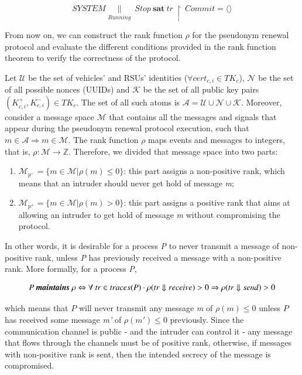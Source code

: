 \documentclass[preprint,12pt]{elsarticle}
\begin{document}
\begin{equation}
\label{eq:systemsatisfystop}
SYSTEM \underset{Running}{\|}~\textit{Stop}~\textbf{sat}~tr~\upharpoonright~\textit{Commit} = \langle \rangle
\end{equation}

From now on, we can construct the rank function $\rho$ for the pseudonym renewal protocol and evaluate the different conditions provided in the rank function theorem to verify the correctness of the protocol.

Let $\mathcal{U}$ be the set of vehicles' and RSUs' identities ($\forall cert_{c, i} \in TK_{c}$), $\mathcal{N}$ be the set of all possible nonces (UUIDs) and $\mathcal{K}$ be the set of all public key pairs $(K^{+}_{c, i}, K^{-}_{c, i}) \in TK_c$. The set of all such atoms is $\mathcal{A} = \mathcal{U} \cup \mathcal{N} \cup \mathcal{K}$. Moreover, consider a message space $\mathcal{M}$ that contains all the messages and signals that appear during the pseudonym renewal protocol execution, such that $m \in \mathcal{A} \Rightarrow m \in \mathcal{M}$. The rank function $\rho$ maps events and messages to integers, that is, $\rho: \mathcal{M} \rightarrow \mathbb{Z}$. Therefore, we divided that message space into two parts:

\begin{enumerate}
	\item $\mathcal{M}_{p^{-}} = \{ m \in \mathcal{M} | \rho(m) \leq 0\}$: this part assigns a non-positive rank, which means that an intruder should never get hold of message \textit{m};
	\item $\mathcal{M}_{p^{+}} = \{ m \in \mathcal{M} | \rho(m) > 0\}$: this part assigns a positive rank that aims at allowing an intruder to get hold of message \textit{m} without compromising the protocol.
\end{enumerate}

In other words, it is desirable for a process \textit{P} to never transmit a message of non-positive rank, unless \textit{P} has previously received a message with a non-positive rank. More formally, for a process \textit{P},

\begin{equation}
\label{eq:maintainspositiverank}
P~\textrm{\textbf{\textit{maintains}}}~\rho \Leftrightarrow \forall~tr \in traces(P) \cdot \rho(tr \Downarrow receive) > 0 \Rightarrow \rho(tr \Downarrow send) > 0
\end{equation}

\noindent which means that $P$ will never transmit any message \textit{m} of $\rho(m) \leq 0$ unless $P$ has received some message \textit{m'} of $\rho(m') \leq 0$ previously. Since the communication channel is public - and the intruder can control it - any message that flows through the channels must be of positive rank, otherwise, if messages with non-positive rank is sent, then the intended secrecy of the message is compromised.
\end{document}
